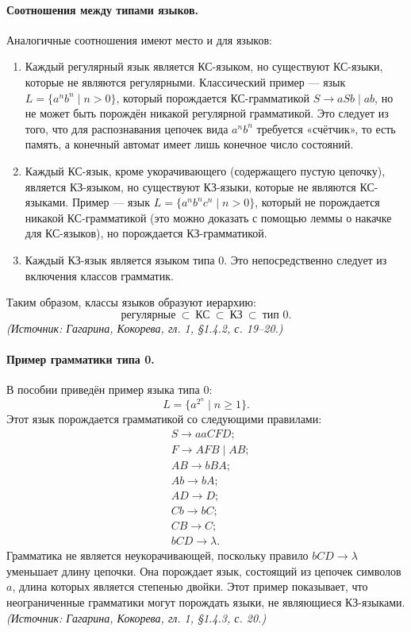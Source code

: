 \documentclass[a4paper,12pt]{article}
\begin{document}
\paragraph{Соотношения между типами языков.}
Аналогичные соотношения имеют место и для языков:
\begin{enumerate}[label=\arabic*)]
\item Каждый регулярный язык является КС-языком, но существуют КС-языки, которые не являются регулярными. Классический пример — язык \(L=\{a^n b^n\mid n>0\}\), который порождается КС-грамматикой \(S\to aSb\mid ab\), но не может быть порождён никакой регулярной грамматикой. Это следует из того, что для распознавания цепочек вида \(a^n b^n\) требуется «счётчик», то есть память, а конечный автомат имеет лишь конечное число состояний.
\item Каждый КС-язык, кроме укорачивающего (содержащего пустую цепочку), является КЗ-языком, но существуют КЗ-языки, которые не являются КС-языками. Пример — язык \(L=\{a^n b^n c^n\mid n>0\}\), который не порождается никакой КС-грамматикой (это можно доказать с помощью леммы о накачке для КС-языков), но порождается КЗ-грамматикой.
\item Каждый КЗ-язык является языком типа 0. Это непосредственно следует из включения классов грамматик.
\end{enumerate}
Таким образом, классы языков образуют иерархию:
\[
\text{регулярные}\ \subset\ \text{КС}\ \subset\ \text{КЗ}\ \subset\ \text{тип 0}.
\]
\textit{(Источник: Гагарина, Кокорева, гл. 1, §1.4.2, с. 19--20.)}

\paragraph{Пример грамматики типа 0.}
В пособии приведён пример языка типа 0:
\[
L=\{a^{2^n}\mid n\ge1\}.
\]
Этот язык порождается грамматикой со следующими правилами:
\[
\begin{aligned}
& S\to aaCFD;\\
& F\to AFB\mid AB;\\
& AB\to bBA;\\
& Ab\to bA;\\
& AD\to D;\\
& Cb\to bC;\\
& CB\to C;\\
& bCD\to\lambda.
\end{aligned}
\]
Грамматика не является неукорачивающей, поскольку правило \(bCD\to\lambda\) уменьшает длину цепочки. Она порождает язык, состоящий из цепочек символов \(a\), длина которых является степенью двойки. Этот пример показывает, что неограниченные грамматики могут порождать языки, не являющиеся КЗ-языками.
\textit{(Источник: Гагарина, Кокорева, гл. 1, §1.4.3, с. 20.)}
\end{document}
